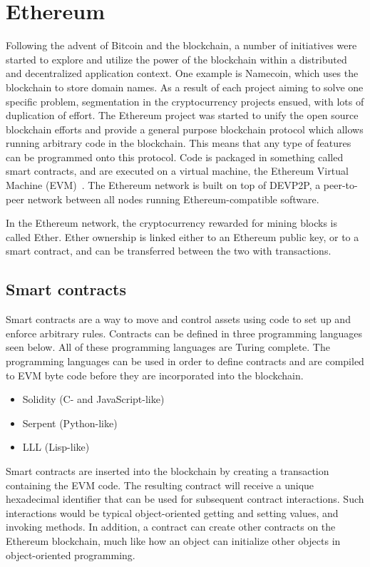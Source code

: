\section{Ethereum}
Following the advent of Bitcoin and the blockchain, a number of initiatives were started to explore and utilize the power of the blockchain within a distributed and decentralized application context. One example is Namecoin, which uses the blockchain to store domain names. As a result of each project aiming to solve one specific problem, segmentation in the cryptocurrency projects ensued, with lots of duplication of effort. The Ethereum project was started to unify the open source blockchain efforts and provide a general purpose blockchain protocol which allows running arbitrary code in the blockchain. This means that any type of features can be programmed onto this protocol. Code is packaged in something called smart contracts, and are executed on a virtual machine, the Ethereum Virtual Machine (EVM)~\cite{ethereum:white}. The Ethereum network is built on top of DEVP2P, a peer-to-peer network between all nodes running Ethereum-compatible software.

In the Ethereum network, the cryptocurrency rewarded for mining blocks is called Ether. Ether ownership is linked either to an Ethereum public key, or to a smart contract, and can be transferred between the two with transactions.

\subsection{Smart contracts}
\label{sec:tech:contracts}
Smart contracts are a way to move and control assets using code to set up and enforce arbitrary rules. Contracts can be defined in three programming languages seen below. All of these programming languages are Turing complete. The programming languages can be used in order to define contracts and are compiled to EVM byte code before they are incorporated into the blockchain.

\begin{itemize}
    \item Solidity (C- and JavaScript-like)
    \item Serpent (Python-like)
    \item LLL (Lisp-like)
\end{itemize}

Smart contracts are inserted into the blockchain by creating a transaction containing the EVM code. The resulting contract will receive a unique hexadecimal identifier that can be used for subsequent contract interactions. Such interactions would be typical object-oriented getting and setting values, and invoking methods. In addition, a contract can create other contracts on the Ethereum blockchain, much like how an object can initialize other objects in object-oriented programming.

